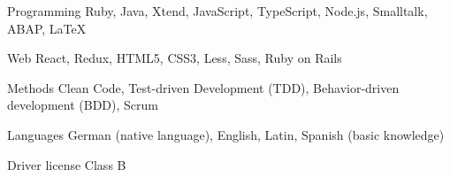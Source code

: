 

\begin{cvskills}

  \cvskill
    {Programming} %
    {Ruby, Java, Xtend, JavaScript, TypeScript, Node.js, Smalltalk, ABAP, \LaTeX} %

  \cvskill
    {Web} %
    {React, Redux, HTML5, CSS3, Less, Sass, Ruby on Rails} %


  \cvskill
    {Methods} %
    {Clean Code, Test-driven Development (TDD), Behavior-driven development (BDD), Scrum} %

  \cvskill
    {Languages} %
    {German (native language), English, Latin, Spanish (basic knowledge)} %

  \cvskill
    {Driver license} %
    {Class B} %

\end{cvskills}
